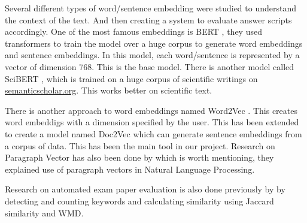 \vspace{-0.75cm}
\par
Several different types of word/sentence embedding were studied to understand the context of the text. 
And then creating a system to evaluate answer scripts accordingly. One of the most famous
embeddings is BERT \cite{bert}, they used transformers to train the model over a huge corpus to generate
word embeddings and sentence embeddings. In this model, each word/sentence is represented by a vector of 
dimension 768. This is the base model. There is another model called SciBERT \cite{scibert},
which is trained on a huge corpus of scientific writings on \href{https://www.semanticscholar.org}{semanticscholar.org}.
This works better on scientific text.
\par
There is another approach to word embeddings named Word2Vec \cite{word2vec}. This creates word embeddigs 
with a dimension specified by the user. This has been extended to create a model named Doc2Vec \cite{doc2vec} which can generate 
sentence embeddings from a corpus of data. This has been the main tool in our project. Research on Paragraph Vector
has also been done by \cite{p2} which is worth mentioning, they explained use of paragraph vectors in
Natural Language Processing.
\par
Research on automated exam paper evaluation is also done previously by \cite{p1} by detecting and counting 
keywords and calculating similarity using Jaccard similarity and WMD. 